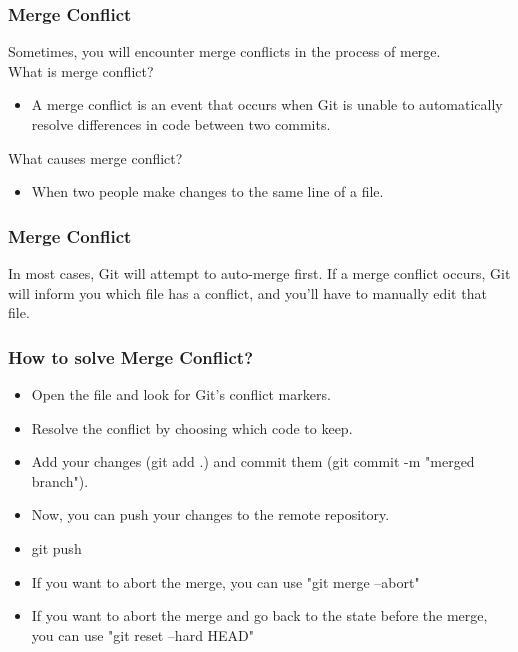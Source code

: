 \documentclass[aspectratio=169]{beamer}
\begin{document}
\begin{frame}
  \frametitle{Merge Conflict}
  Sometimes, you will encounter merge conflicts in the process of merge.\\
  What is merge conflict?\\
  \begin{itemize}
    \item A merge conflict is an event that occurs when Git is unable to automatically resolve differences in code between two commits.\\
  \end{itemize}
  What causes merge conflict?\\
  \begin{itemize}
    \item When two people make changes to the same line of a file.
  \end{itemize}
\end{frame}

\begin{frame}
  \frametitle{Merge Conflict}
  In most cases, Git will attempt to auto-merge first. If a merge conflict occurs, Git will inform you which file has a conflict, and you'll have to manually edit that file.\\
\end{frame}


\begin{frame}
  \frametitle{How to solve Merge Conflict?}
  \begin{itemize}
    \item Open the file and look for Git's conflict markers.\\
    \item Resolve the conflict by choosing which code to keep.\\
    \item Add your changes (git add .) and commit them (git commit -m "merged branch").\\
    \item Now, you can push your changes to the remote repository.\\
    \item git push\\
    \item If you want to abort the merge, you can use "git merge --abort"\\
    \item If you want to abort the merge and go back to the state before the merge, you can use "git reset --hard HEAD"\\
  \end{itemize}
\end{frame}
\end{document}
